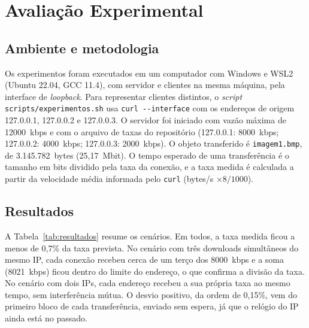 \documentclass[12pt,a4paper]{article}
\begin{document}
\section{Avaliação Experimental}\label{sec:aval}

\subsection{Ambiente e metodologia}

Os experimentos foram executados em um computador com Windows e WSL2 (Ubuntu 22.04,
GCC 11.4), com servidor e clientes na mesma máquina, pela interface de \textit{loopback}.
Para representar clientes distintos, o \textit{script} \texttt{scripts/experimentos.sh}
usa \texttt{curl -{}-interface} com os endereços de origem 127.0.0.1, 127.0.0.2 e 127.0.0.3.
O servidor foi iniciado com vazão máxima de 12000~kbps e com o arquivo de taxas do
repositório (127.0.0.1: 8000~kbps; 127.0.0.2: 4000~kbps; 127.0.0.3: 2000~kbps). O objeto
transferido é \texttt{imagem1.bmp}, de 3.145.782~bytes (25,17~Mbit). O tempo esperado de
uma transferência é o tamanho em bits dividido pela taxa da conexão, e a taxa medida é
calculada a partir da velocidade média informada pelo \texttt{curl}
(bytes/s $\times 8 / 1000$).

\subsection{Resultados}

A Tabela~\ref{tab:resultados} resume os cenários. Em todos, a taxa medida ficou a menos
de 0,7\% da taxa prevista. No cenário com três downloads simultâneos do mesmo IP, cada
conexão recebeu cerca de um terço dos 8000~kbps e a soma (8021~kbps) ficou dentro do
limite do endereço, o que confirma a divisão da taxa. No cenário com dois IPs, cada
endereço recebeu a sua própria taxa ao mesmo tempo, sem interferência mútua. O desvio
positivo, da ordem de 0,15\%, vem do primeiro bloco de cada transferência, enviado sem
espera, já que o relógio do IP ainda está no passado.
\end{document}
